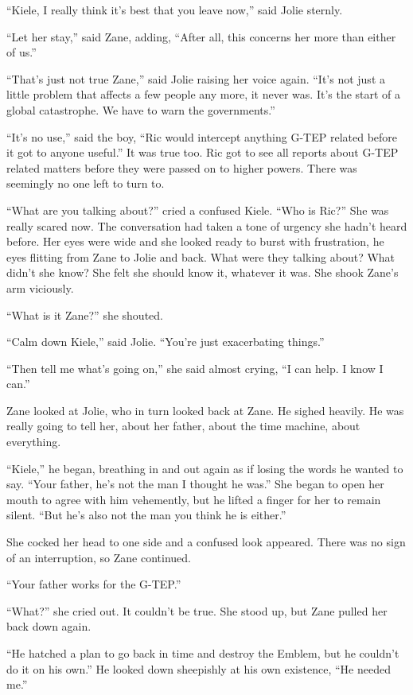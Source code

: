 ``Kiele, I really think it's best that you leave now,'' said Jolie sternly.

``Let her stay,'' said Zane, adding, ``After all, this concerns her more than either of us.''

``That's just not true Zane,'' said Jolie raising her voice again.  ``It's not just a little problem that affects a few people any more, it never was.  It's the start of a global catastrophe.  We have to warn the governments.''

``It's no use,'' said the boy, ``Ric would intercept anything G-TEP related before it got to anyone useful.''  It was true too.  Ric got to see all reports about G-TEP related matters before they were passed on to higher powers.  There was seemingly no one left to turn to.

``What are you talking about?'' cried a confused Kiele.  ``Who is Ric?''  She was really scared now.  The conversation had taken a tone of urgency she hadn't heard before.  Her eyes were wide and she looked ready to burst with frustration, he eyes flitting from Zane to Jolie and back.  What were they talking about?  What didn't she know?  She felt she should know it, whatever it was.  She shook Zane's arm viciously.

``What is it Zane?'' she shouted.

``Calm down Kiele,'' said Jolie.  ``You're just exacerbating things.''

``Then tell me what's going on,'' she said almost crying, ``I can help.  I know I can.''

Zane looked at Jolie, who in turn looked back at Zane.  He sighed heavily.  He was really going to tell her, about her father, about the time machine, about everything.

``Kiele,'' he began, breathing in and out again as if losing the words he wanted to say.  ``Your father, he's not the man I thought he was.''  She began to open her mouth to agree with him vehemently, but he lifted a finger for her to remain silent.  ``But he's also not the man you think he is either.''

She cocked her head to one side and a confused look appeared.  There was no sign of an interruption, so Zane continued.

``Your father works for the G-TEP.''

``What?'' she cried out.  It couldn't be true.  She stood up, but Zane pulled her back down again.

``He hatched a plan to go back in time and destroy the Emblem, but he couldn't do it on his own.''  He looked down sheepishly at his own existence, ``He needed me.''  


